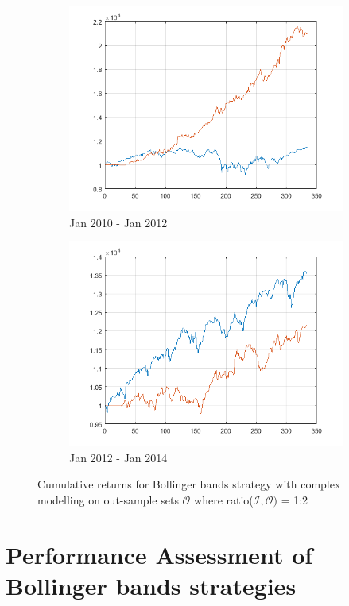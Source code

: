 \documentclass[11pt,a4,twosided,singlespacing,titlepagenumber=on]{scrreprt}
\numberwithin{equation}{chapter} %
\theoremstyle{remark}
\begin{document}
\begin{figure}[H]
\begin{subfigure}[t]{0.32\textwidth}
        \includegraphics[width=1\textwidth]{res/backtest_cpx/11}
        \caption{Jan 2010 - Jan 2012}
    \end{subfigure}
    \begin{subfigure}[t]{0.32\textwidth}
        \centering
        \includegraphics[width=1\textwidth]{res/backtest_cpx/12}
        \caption{Jan 2012 - Jan 2014}
    \end{subfigure}
    \caption{Cumulative returns for Bollinger bands strategy with complex modelling on out-sample sets $\mathcal{O}$ where ratio($\mathcal{I}, \mathcal{O})$ = 1:2}
    \label{fig:bollinger_bands_strategy_simple}
\end{figure}

\section{Performance Assessment of Bollinger bands strategies}
\end{document}
